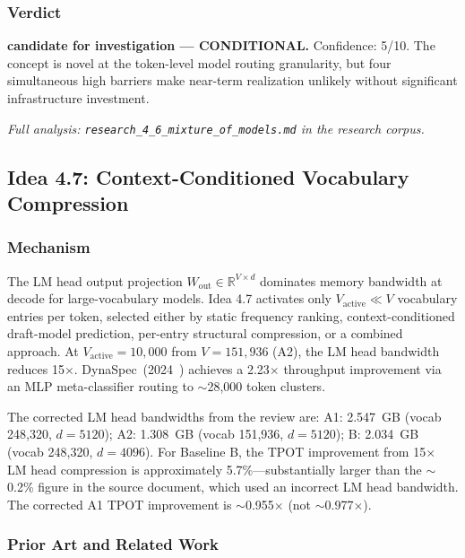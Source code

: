 \documentclass[11pt]{article}
\begin{document}
\subsubsection*{Verdict}

\noindent\textbf{candidate for investigation --- CONDITIONAL.} Confidence: 5/10. The concept is novel at the token-level model routing granularity, but four simultaneous high barriers make near-term realization unlikely without significant infrastructure investment.

\par\noindent\textit{Full analysis: \texttt{research\_4\_6\_mixture\_of\_models.md} in the research corpus.}


\subsection{Idea 4.7: Context-Conditioned Vocabulary Compression}
\label{subsec:idea47}

\subsubsection*{Mechanism}

The LM head output projection $W_{\text{out}} \in \mathbb{R}^{V \times d}$ dominates memory bandwidth at decode for large-vocabulary models. Idea 4.7 activates only $V_{\text{active}} \ll V$ vocabulary entries per token, selected either by static frequency ranking, context-conditioned draft-model prediction, per-entry structural compression, or a combined approach. At $V_{\text{active}}{=}10{,}000$ from $V{=}151{,}936$ (A2), the LM head bandwidth reduces 15$\times$. DynaSpec~(2024~\cite{DynaSpec2024}) achieves a 2.23$\times$ throughput improvement via an MLP meta-classifier routing to $\sim$28{,}000 token clusters.

The corrected LM head bandwidths from the review are: A1: 2.547~GB (vocab 248{,}320, $d{=}5120$); A2: 1.308~GB (vocab 151{,}936, $d{=}5120$); B: 2.034~GB (vocab 248{,}320, $d{=}4096$). For Baseline B, the TPOT improvement from 15$\times$ LM head compression is approximately 5.7\%---substantially larger than the $\sim$0.2\% figure in the source document, which used an incorrect LM head bandwidth. The corrected A1 TPOT improvement is $\sim$0.955$\times$ (not $\sim$0.977$\times$).

\subsubsection*{Prior Art and Related Work}
\end{document}
